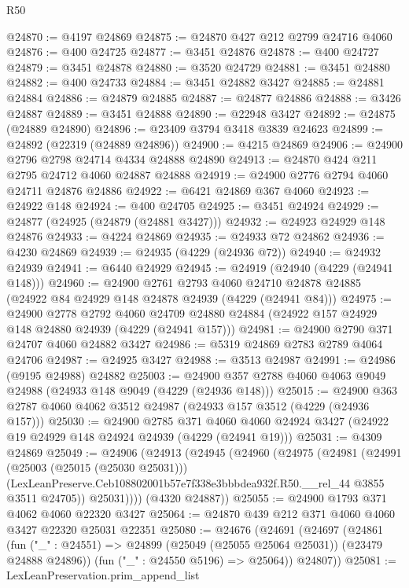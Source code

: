 \begin{lexlean}{R50}
\begin{coremodule}
@24870 := @4197 @24869
@24875 := @24870 @427 @212 @2799 @24716 @4060
@24876 := @400 @24725
@24877 := @3451 @24876
@24878 := @400 @24727
@24879 := @3451 @24878
@24880 := @3520 @24729
@24881 := @3451 @24880
@24882 := @400 @24733
@24884 := @3451 @24882 @3427
@24885 := @24881 @24884
@24886 := @24879 @24885
@24887 := @24877 @24886
@24888 := @3426 @24887
@24889 := @3451 @24888
@24890 := @22948 @3427
@24892 := @24875 (@24889 @24890)
@24896 := @23409 @3794 @3418 @3839 @24623
@24899 := @24892 (@22319 (@24889 @24896))
@24900 := @4215 @24869
@24906 := @24900 @2796 @2798 @24714 @4334 @24888 @24890
@24913 := @24870 @424 @211 @2795 @24712 @4060 @24887 @24888
@24919 := @24900 @2776 @2794 @4060 @24711 @24876 @24886
@24922 := @6421 @24869 @367 @4060
@24923 := @24922 @148
@24924 := @400 @24705
@24925 := @3451 @24924
@24929 := @24877 (@24925 (@24879 (@24881 @3427)))
@24932 := @24923 @24929 @148 @24876
@24933 := @4224 @24869
@24935 := @24933 @72 @24862
@24936 := @4230 @24869
@24939 := @24935 (@4229 (@24936 @72))
@24940 := @24932 @24939
@24941 := @6440 @24929
@24945 := @24919 (@24940 (@4229 (@24941 @148)))
@24960 := @24900
    @2761
    @2793
    @4060
    @24710
    @24878
    @24885
    (@24922 @84 @24929 @148 @24878 @24939 (@4229 (@24941 @84)))
@24975 := @24900
    @2778
    @2792
    @4060
    @24709
    @24880
    @24884
    (@24922 @157 @24929 @148 @24880 @24939 (@4229 (@24941 @157)))
@24981 := @24900 @2790 @371 @24707 @4060 @24882 @3427
@24986 := @5319 @24869 @2783 @2789 @4064 @24706
@24987 := @24925 @3427
@24988 := @3513 @24987
@24991 := @24986 (@9195 @24988) @24882
@25003 := @24900 @357 @2788 @4060 @4063 @9049 @24988 (@24933 @148 @9049 (@4229 (@24936 @148)))
@25015 := @24900 @363 @2787 @4060 @4062 @3512 @24987 (@24933 @157 @3512 (@4229 (@24936 @157)))
@25030 := @24900
    @2785
    @371
    @4060
    @4060
    @24924
    @3427
    (@24922 @19 @24929 @148 @24924 @24939 (@4229 (@24941 @19)))
@25031 := @4309 @24869
@25049 := @24906
    (@24913
      (@24945
        (@24960
          (@24975
            (@24981
              (@24991
                (@25003 (@25015 (@25030 @25031)))
                (LexLeanPreserve.Ceb108802001b57e7f338e3bbbdea932f.R50.__rel_44 @3855 @3511 @24705))
              @25031))))
      (@4320 @24887))
@25055 := @24900 @1793 @371 @4062 @4060 @22320 @3427
@25064 := @24870 @439 @212 @371 @4060 @4060 @3427 @22320 @25031 @22351
@25080 := @24676
    (@24691
      (@24697
        (@24861
          (fun ("_" : @24551) => @24899 (@25049 (@25055 @25064 @25031)) (@23479 @24888 @24896))
          (fun ("_" : @24550 @5196) => @25064))
        @24807))
@25081 := LexLeanPreservation.prim_append_list

\end{coremodule}
\end{lexlean}
